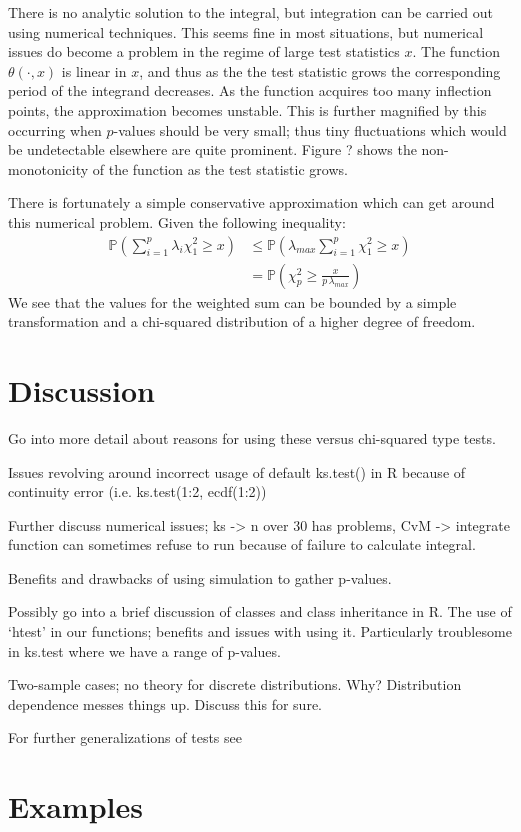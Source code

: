\documentclass[article]{jss}
\begin{document}
There is no analytic solution to the integral, but integration can be carried out using numerical techniques. This seems
fine in most situations, but numerical issues do become a problem in the regime of large test statistics $x$. The function
$\theta(\cdot, x)$ is linear in $x$, and thus as the the test statistic grows the corresponding period of the integrand 
decreases. As the function acquires too many inflection points, the approximation becomes unstable. This is further
magnified by this occurring when $p$-values should be very small; thus tiny fluctuations which would be undetectable
elsewhere are quite prominent. Figure ? shows the non-monotonicity of the function as the test statistic grows.

There is fortunately a simple conservative approximation which can get around this numerical problem. Given the
following inequality:
\begin{align*}
\mathbb{P} \left(\sum_{i=1}^{p} \lambda_i \chi^2_1 \geq x \right) &\leq \mathbb{P} \left( \lambda_{max} \sum_{i=1}^{p} \chi^2_1 \geq x \right) \\
&= \mathbb{P} \left(\chi^2_p \geq \frac{x}{p \, \lambda_{max}} \right)
\end{align*}
We see that the values for the weighted sum can be bounded by a simple transformation and a chi-squared distribution
of a higher degree of freedom. 

\section{Discussion}

Go into more detail about reasons for using these versus chi-squared type tests. 

Issues revolving around incorrect usage of default ks.test() in R because of continuity error (i.e. ks.test(1:2, ecdf(1:2))

Further discuss numerical issues; ks -> n over 30 has problems, CvM -> integrate function can sometimes refuse to run because of failure to calculate integral.

Benefits and drawbacks of using simulation to gather p-values. 

Possibly go into a brief discussion of classes and class inheritance in R. The use of `htest' in our functions; benefits and issues with using it. Particularly troublesome in ks.test where we have a range of p-values.

Two-sample cases; no theory for discrete distributions. Why? Distribution dependence messes things up. Discuss this for sure.

For further generalizations of tests see \cite{dewev1973}

\section{Examples}


%

\end{document}
